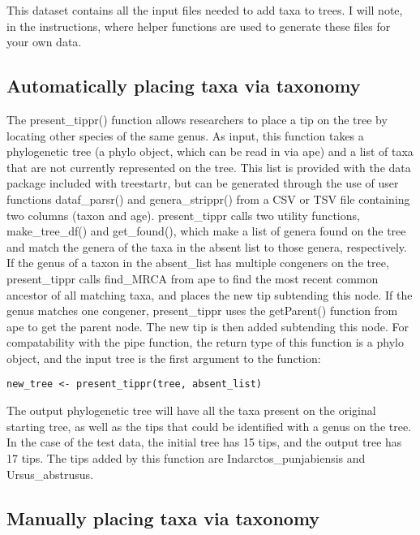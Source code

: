 This dataset contains all the input files needed to add taxa to trees. 
I will note, in the instructions, where helper functions are used to generate these files for your own data.

\subsection{Automatically placing taxa via taxonomy}

The present\_tippr() function allows researchers to place a tip on the tree by locating other species of the same genus.
As input, this function takes a phylogenetic tree (a phylo object, which can be read in via ape) and a list of taxa that are not currently represented on the tree.
This list is provided with the data package included with treestartr, but can be generated through the use of user functions dataf\_parsr() and genera\_strippr() from a CSV or TSV file containing two columns (taxon and age).
present\_tippr calls two utility functions, make\_tree\_df() and get\_found(), which make a list of genera found on the tree and match the genera of the taxa in the absent list to those genera, respectively.
If the genus of a taxon in the absent\_list has multiple congeners on the tree, present\_tippr calls find\_MRCA from ape to find the most recent common ancestor of all matching taxa, and places the new tip subtending this node.
If the genus matches one congener, present\_tippr uses the getParent() function from ape to get the parent node.
The new tip is then added subtending this node.
For compatability with the pipe function, the return type of this function is a phylo object, and the input tree is the first argument to the function:

{\tt \begin{snugshade*}
\begin{lstlisting}
new_tree <- present_tippr(tree, absent_list)
\end{lstlisting}
\end{snugshade*}}


The output phylogenetic tree will have all the taxa present on the original starting tree, as well as the tips that could be identified with a genus on the tree.
In the case of the test data, the initial tree has 15 tips, and the output tree has 17 tips.
The tips added by this function are Indarctos\_punjabiensis and Ursus\_abstrusus.

\subsection{Manually placing taxa via taxonomy}

